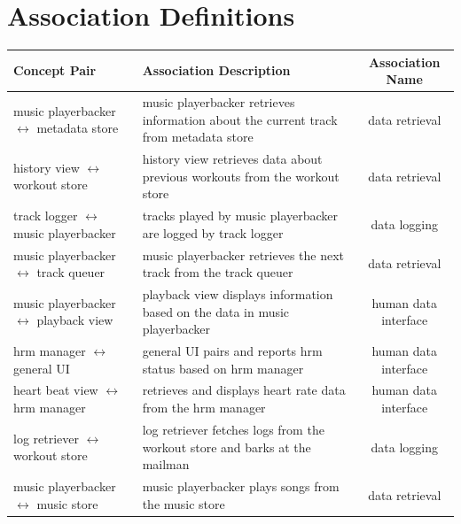 \documentclass[letterpaper,english, 12pt]{scrreprt}
\begin{document}
    \section{Association Definitions}
		
		\begin{center}
			\renewcommand{\arraystretch}{1.5}
	        \begin{tabular}{| m{} | m{} | c |}
	            \hline
	            Concept Pair & Association Description & Association Name\\
	            \hline
	            music playerbacker $\leftrightarrow$ metadata store & music playerbacker retrieves information about the current track from metadata store & data retrieval\\
				\hline
	            history view $\leftrightarrow$ workout store & history view retrieves data about previous workouts from the workout store & data retrieval\\
				\hline
	            track logger $\leftrightarrow$ music playerbacker & tracks played by music playerbacker are logged by track logger & data logging\\
				\hline
	            music playerbacker $\leftrightarrow$ track queuer & music playerbacker retrieves the next track from the track queuer & data retrieval\\
				\hline
	            music playerbacker $\leftrightarrow$ playback view & playback view displays information based on the data in music playerbacker & human data interface\\
				\hline
	            hrm manager $\leftrightarrow$ general UI & general UI pairs and reports hrm status based on hrm manager & human data interface\\
				\hline
	            heart beat view $\leftrightarrow$ hrm manager & retrieves and displays heart rate data from the hrm manager & human data interface\\
				\hline
	            log retriever $\leftrightarrow$ workout store & log retriever fetches logs from the workout store and barks at the mailman & data logging\\
				\hline
	            music playerbacker $\leftrightarrow$ music store & music playerbacker plays songs from the music store & data retrieval\\
				\hline
	        \end{tabular}
		\end{center}
\end{document}
